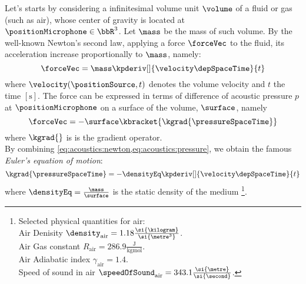 Let's starts by considering a infinitesimal volume unit $\volume$ of a fluid or gas (such as air),
whose center of gravity is located at $\positionMicrophone \in \bbR^3$.
Let $\mass$ be the mass of such volume.
By the well-known Newton's second law, applying a force $\forceVec$ to the fluid, its acceleration increase proportionally to $\mass$,
namely:
\begin{equation}
    \label{eq:acoustics:newton}
    \forceVec = \mass \kpderiv[]{\velocity\depSpaceTime}{t}
\end{equation}
where $\velocity(\positionSource, t)$ denotes the volume velocity and $t$ the time $[\si{\second}]$.
The force can be expressed in terms of difference of acoustic pressure $p$ at $\positionMicrophone$ on a surface of the volume, $\surface$, namely
\begin{equation}
    \label{eq:acoustics:pressure}
    \forceVec = - \surface \kbracket{\kgrad{\pressureSpaceTime}}
\end{equation}
where $\kgrad{}$ is is the gradient operator.
\\By combining \cref{eq:acoustics:newton,eq:acoustics:pressure}, we obtain the famous \textit{Euler's equation of motion}:
\begin{equation}
    \label{eq:acoustics:euler}
    \kgrad{\pressureSpaceTime} = - \densityEq \kpderiv[]{\velocity\depSpaceTime}{t}
\end{equation}
where $\densityEq = \frac{\mass}{\surface}$ is the static density of the medium
\footnote{%
\label{fn:acoustics:airconstanc}
Selected physical quantities for air:
\\Air Denisity $\density_{\text{air}} = 1.18 \tfrac{\si{\kilogram}}{\si{\metre^3}}$.
\\Air Gas constant $R_{\text{air}} = 286.9 \tfrac{\si{\joule}}{\si{\kilogram} \si{\mole}}$.
\\Air Adiabatic index $\gamma_{\text{air}} = 1.4$.
\\Speed of sound in air $\speedOfSound_{\text{air}} = 343.1 \tfrac{\si{\metre}}{\si{\second}}$.
}.

